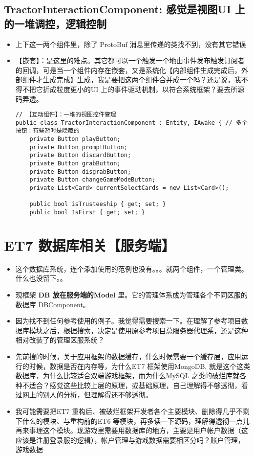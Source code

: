 \documentclass[9pt, b5paper]{article}
\begin{document}
\subsection{TractorInteractionComponent: 感觉是视图UI 上的一堆调控，逻辑控制}
\label{sec-3-8}
\begin{itemize}
\item 上下这一两个组件里，除了 ProtoBuf 消息里传递的类找不到，没有其它错误
\item 【嵌套】：是这里的难点。其它都可以一个触发一个地由事件发布触发订阅者的回调，可是当一个组件内存在嵌套，又是系统化【内部组件生成完成后，外部组件才生成完成】生成，我是要把这两个组件合并成一个吗？还是说，我不得不把它折成粒度更小的UI 上的事件驱动机制，以符合系统框架？要去所源码弄透。
\begin{verbatim}
// 【互动组件】：一堆的视图控件管理 
public class TractorInteractionComponent : Entity, IAwake { // 多个按钮：有些暂时是隐藏的
    private Button playButton;
    private Button promptButton;
    private Button discardButton;
    private Button grabButton;
    private Button disgrabButton;
    private Button changeGameModeButton;
    private List<Card> currentSelectCards = new List<Card>();

    public bool isTrusteeship { get; set; }
    public bool IsFirst { get; set; }
\end{verbatim}
\end{itemize}

\section{ET7 数据库相关【服务端】}
\label{sec-4}
\begin{itemize}
\item 这个数据库系统，连个添加使用的范例也没有。。。就两个组件，一个管理类。什么也没留下。。
\item 现框架 \textbf{DB 放在服务端的Model} 里。它的管理体系成为管理各个不同区服的数据库 DBComponent。
\item 因为找不到任何参考使用的例子。我觉得需要搜索一下。在理解了参考项目数据库模块之后，根据搜索，决定是使用原参考项目总服务器代理系，还是这种相对改装了的管理区服系统？
\item 先前搜的时候，关于应用框架的数据缓存，什么时候需要一个缓存层，应用运行的时候，数据是否在内存等，为什么ET7 框架使用MongoDB, 就是这个这类数据库，为什么比较适合双端游戏框架，而为什么MySQL 之类的破烂库就各种不适合？感觉这些比较上层的原理，或基础原理，自己理解得不够透彻，看过网上的别人的分析，但理解得还不够透彻。
\item 我可能需要把ET7 重构后、被破烂框架开发者各个主要模块、删除得几乎不剩下什么的模块、与重构前的ET6 等模块，再多读一下源码，理解得透彻一点儿再来事理这个模块。现游戏里需要用数据库的地方，主要是用户帐户数据（这应该是注册登录服的逻辑），帐户管理与游戏数据需要相区分吗？账户管理，游戏数据
\end{itemize}
\end{document}
